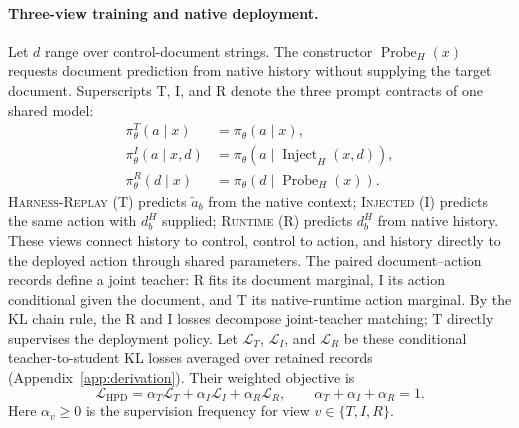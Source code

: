 \documentclass{article}
\newcommand{\replayaction}{\textsc{Harness-Replay}}
\newcommand{\injected}{\textsc{Injected}}
\newcommand{\runtime}{\textsc{Runtime}}
\begin{document}
\paragraph{Three-view training and native deployment.}
Let $d$ range over control-document strings. The constructor
$\operatorname{Probe}_H(x)$ requests document prediction from native history
without supplying the target document. Superscripts T, I, and R denote the
three prompt contracts of one shared model:
\begin{equation}
\begin{aligned}
\pi_\theta^T(a\mid x)
&=\pi_\theta(a\mid x),\\
\pi_\theta^I(a\mid x,d)
&=\pi_\theta(a\mid\operatorname{Inject}_H(x,d)),\\
\pi_\theta^R(d\mid x)
&=\pi_\theta(d\mid\operatorname{Probe}_H(x)).
\end{aligned}
\label{eq:three-view-policies}
\end{equation}
\replayaction{} (T) predicts $\tilde a_b$ from the native context;
\injected{} (I) predicts the same action with $d_b^H$ supplied;
\runtime{} (R) predicts $d_b^H$ from native history. These views connect
history to control, control to action, and history directly to the deployed
action through shared parameters. The paired document--action records define
a joint teacher: R fits its document marginal, I its action conditional given
the document, and T its native-runtime action marginal. By the KL chain rule,
the R and I losses decompose joint-teacher matching; T directly supervises
the deployment policy. Let $\mathcal L_T$, $\mathcal L_I$, and $\mathcal L_R$
be these conditional teacher-to-student KL losses averaged over retained
records (Appendix~\ref{app:derivation}). Their weighted objective is
\begin{equation}
\mathcal L_{\mathrm{HPD}}
=\alpha_T\mathcal L_T+\alpha_I\mathcal L_I+\alpha_R\mathcal L_R,
\qquad
\alpha_T+\alpha_I+\alpha_R=1.
\label{eq:hpd-objective}
\end{equation}
Here $\alpha_v\geq0$ is the supervision frequency for view
$v\in\{T,I,R\}$.
\end{document}
